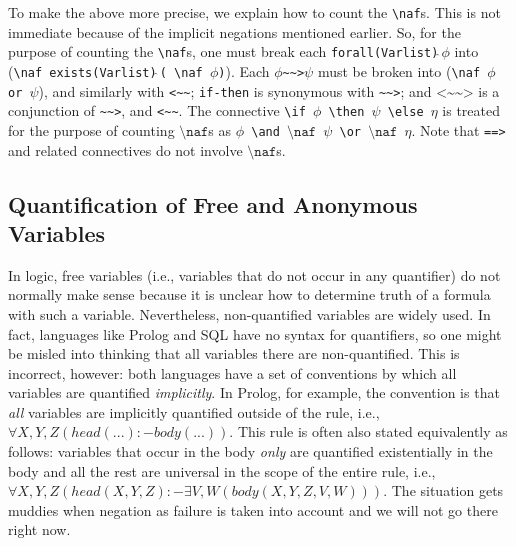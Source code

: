 \documentclass[11pt]{article}
\newcommand{\rnafarr}{\texttt{\textasciitilde\textasciitilde>}}
\newcommand{\lnafarr}{\texttt{<\textasciitilde\textasciitilde}}
\newcommand{\rlnafarr}{\texttt{<\textasciitilde\textasciitilde>}}
\newcommand{\bs}{\textbackslash}
\newcommand{\RULELOGNAF}{{\texttt{{\bs}naf}}\xspace}
\begin{document}
To make the above more precise, we explain how to count the \texttt{\RULELOGNAF}s. This is
not immediate because of the implicit negations mentioned earlier.
So, for the purpose of counting the \texttt{\RULELOGNAF}s, one must break
each \texttt{forall(Varlist)$\widehat{\ }\phi$}  into
(\texttt{\RULELOGNAF\,exists(Varlist)$\widehat{\ }$( \RULELOGNAF\,$\phi$)}). Each
$\phi$\rnafarr$\psi$ must be
broken into  (\texttt{\RULELOGNAF\,$\phi$ or $\psi$}), and similarly with
\lnafarr;
\texttt{if-then} is synonymous with \rnafarr; and   $\rlnafarr$
is a conjunction of \rnafarr, and \lnafarr. The connective
\texttt{\bs{}if\,$\phi$\,\bs{}then\,$\psi$\,\bs{}else\,$\eta$}
is treated for the purpose of
counting $\RULELOGNAF$s as
\texttt{$\phi$\,\bs{}and\,$\RULELOGNAF$\,$\psi$\,\bs{}or\,$\RULELOGNAF$\,$\eta$}.  Note that \texttt{==>} and related
connectives do not involve $\RULELOGNAF$s.

\subsection{Quantification of Free and Anonymous Variables}

In logic, free variables (i.e., variables that do not  occur in any quantifier)
do not normally make sense because
it is unclear how to determine truth of a formula with such a variable.
Nevertheless, non-quantified variables are widely used. In fact,
languages like Prolog and SQL have no syntax for quantifiers, so one might
be misled into thinking that all variables there are non-quantified.
This is incorrect, however: both languages have a set of conventions by
which all variables are quantified \emph{implicitly}. In Prolog, for
example, the convention is that \emph{all} variables are implicitly quantified  
outside of the rule, i.e., $\forall X,Y,Z (head(...) :- body(...))$.
This rule is often also stated equivalently as follows: variables that
occur in the body \emph{only} are quantified existentially in the body and all the
rest are universal in the scope of the entire rule, i.e., $\forall X,Y,Z
(head(X,Y,Z) :- \exists V,W (body(X,Y,Z,V,W)))$. The situation gets muddies
when negation as failure is taken into account and we will not go there
right now.
\end{document}
